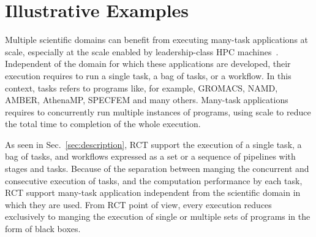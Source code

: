 \documentclass[preprint,12pt, a4paper]{elsarticle}
\begin{document}
\section{Illustrative Examples}\label{sec:examples}




Multiple scientific domains can benefit from executing many-task applications
at scale, especially at the scale enabled by leadership-class HPC
machines~\cite{raicu2008many,iosup2011performance}. Independent of the domain
for which these applications are developed, their execution requires to run a
single task, a bag of tasks, or a workflow. In this context, tasks refers to
programs like, for example, GROMACS, NAMD, AMBER, AthenaMP, SPECFEM and many
others. Many-task applications requires to concurrently run multiple
instances of programs, using scale to reduce the total time to completion of
the whole execution.

As seen in Sec.~\ref{sec:description}, RCT support the execution of a single
task, a bag of tasks, and workflows expressed as a set or a sequence of
pipelines with stages and tasks. Because of the separation between manging
the concurrent and consecutive execution of tasks, and the computation
performance by each task, RCT support many-task application independent from
the scientific domain in which they are used. From RCT point of view, every
execution reduces exclusively to manging the execution of single or multiple
sets of programs in the form of black boxes.
\end{document}
